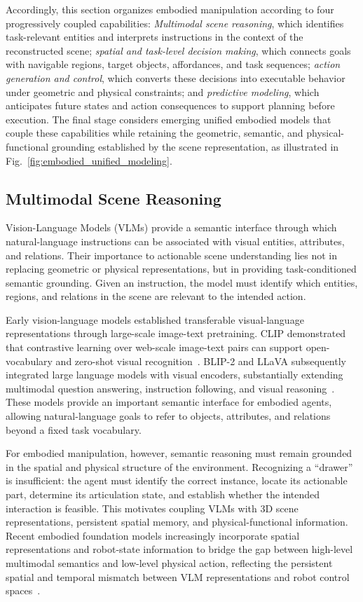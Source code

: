 \documentclass{SCIS2026}
\begin{document}
Accordingly, this section organizes embodied manipulation according to four progressively coupled capabilities: \emph{Multimodal scene reasoning}, which identifies task-relevant entities and interprets instructions in the context of the reconstructed scene; \emph{spatial and task-level decision making}, which connects goals with navigable regions, target objects, affordances, and task sequences; \emph{action generation and control}, which converts these decisions into executable behavior under geometric and physical constraints; and \emph{predictive modeling}, which anticipates future states and action consequences to support planning before execution. The final stage considers emerging unified embodied models that couple these capabilities while retaining the geometric, semantic, and physical-functional grounding established by the scene representation, as illustrated in Fig.~\ref{fig:embodied_unified_modeling}.
\subsection{Multimodal Scene Reasoning}
Vision-Language Models (VLMs) provide a semantic interface through which natural-language instructions can be associated with visual entities, attributes, and relations. Their importance to actionable scene understanding lies not in replacing geometric or physical representations, but in providing task-conditioned semantic grounding. Given an instruction, the model must identify which entities, regions, and relations in the scene are relevant to the intended action.

Early vision-language models established transferable visual-language representations through large-scale image-text pretraining. CLIP demonstrated that contrastive learning over web-scale image-text pairs can support open-vocabulary and zero-shot visual recognition~\cite{radford2021clip}. BLIP-2 and LLaVA subsequently integrated large language models with visual encoders, substantially extending multimodal question answering, instruction following, and visual reasoning~\cite{li2023blip,liu2023visual}. These models provide an important semantic interface for embodied agents, allowing natural-language goals to refer to objects, attributes, and relations beyond a fixed task vocabulary.

For embodied manipulation, however, semantic reasoning must remain grounded in the spatial and physical structure of the environment. Recognizing a ``drawer'' is insufficient: the agent must identify the correct instance, locate its actionable part, determine its articulation state, and establish whether the intended interaction is feasible. This motivates coupling VLMs with 3D scene representations, persistent spatial memory, and physical-functional information. Recent embodied foundation models increasingly incorporate spatial representations and robot-state information to bridge the gap between high-level multimodal semantics and low-level physical action, reflecting the persistent spatial and temporal mismatch between VLM representations and robot control spaces~\cite{zhen20243d}.
\end{document}
